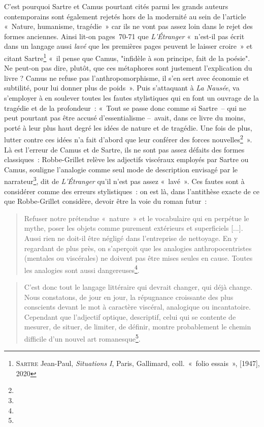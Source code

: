 \documentclass[12pt, a4paper]{article}
\begin{document}
C'est pourquoi Sartre et Camus pourtant cités parmi les grands auteurs contemporains sont également rejetés hors de la modernité au sein de l'article «~Nature, humanisme, tragédie~» car ils ne vont pas assez loin dans le rejet des formes anciennes. Ainsi lit-on pages~70-71 que \textit{L'Étranger} «~n’est-il pas écrit dans un langage aussi \textit{lavé} que les premières pages peuvent le laisser croire~» et citant Sartre\footnote{\textsc{Sartre} Jean-Paul, \textit{Situations I}, Paris, Gallimard, coll.~«~folio essais~», [1947], 2020} «~il pense que Camus, "infidèle à son principe, fait de la poésie". Ne peut-on pas dire, plutôt, que ces métaphores sont justement l’explication du livre ? Camus ne refuse pas l’anthropomorphisme, il s’en sert avec économie et subtilité, pour lui donner plus de poids~». Puis s'attaquant à \textit{La Nausée}, \robbe{} va s'employer à en soulever toutes les fautes stylistiques qui en font un ouvrage de la tragédie et de la profondeur~: «~Tout se passe donc comme si Sartre~– qui ne peut pourtant pas être accusé d’essentialisme –~avait, dans ce livre du moins, porté à leur plus haut degré les idées de nature et de tragédie. Une fois de plus, lutter contre ces idées n’a fait d’abord que leur conférer des forces nouvelles\footnote{}~».
Là est l'erreur de Camus et de Sartre, ils ne sont pas assez défaits des formes classiques~: Robbe-Grillet relève les adjectifs viscéraux employés par Sartre ou Camus, souligne l'analogie comme seul mode de description envisagé par le narrateur\footnote{}, dit de \textit{L'Étranger} qu'il n'est pas assez «~lavé~». Ces fautes sont à considérer comme des erreurs stylistiques~: on est là, dans l'antithèse exacte de ce que Robbe-Grillet considère, devoir être la voie du roman futur~:

\begin{quote}
    Refuser notre prétendue «~nature~» et le vocabulaire qui en perpétue le mythe, poser les objets comme purement extérieurs et superficiels [...]. Aussi rien ne doit-il être négligé dans l’entreprise de nettoyage. En y regardant de plus près, on s’aperçoit que les analogies anthropocentristes (mentales ou viscérales) ne doivent pas être mises seules en cause. Toutes les analogies sont aussi dangereuses\footnote{}.
\end{quote}

\begin{quote}
    C’est donc tout le langage littéraire qui devrait changer, qui déjà change. Nous constatons, de jour en jour, la répugnance croissante des plus conscients devant le mot à caractère viscéral, analogique ou incantatoire. Cependant que l’adjectif optique, descriptif, celui qui se contente de mesurer, de situer, de limiter, de définir, montre probablement le chemin difficile d’un nouvel art romanesque\footnote{}.
\end{quote}
\end{document}
